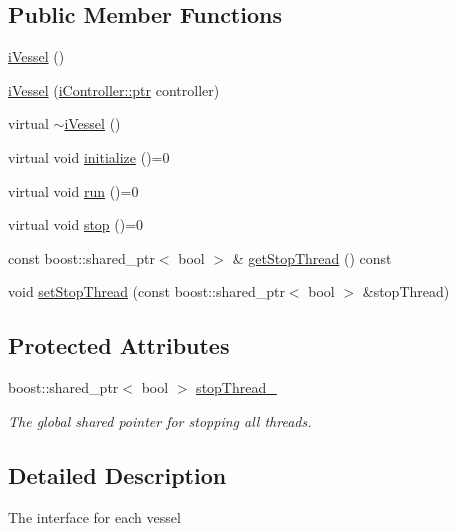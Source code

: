 \subsection*{Public Member Functions}
\begin{DoxyCompactItemize}
\item 
\hyperlink{classo_cpt_1_1i_vessel_a28f9a5ff20f10dc68261b646da3940a5}{i\+Vessel} ()
\item 
\hyperlink{classo_cpt_1_1i_vessel_ac4f486fcfad657f860da2062fef9d7d6}{i\+Vessel} (\hyperlink{classo_cpt_1_1i_controller_a6d89a95cd6ad68bb74adfaca2f36370f}{i\+Controller\+::ptr} controller)
\item 
virtual \hyperlink{classo_cpt_1_1i_vessel_acceefb7d9bffed4f4d8c86fa6808ec23}{$\sim$i\+Vessel} ()
\item 
virtual void \hyperlink{classo_cpt_1_1i_vessel_a866ddfa5330bbb24277de57554a41811}{initialize} ()=0
\item 
virtual void \hyperlink{classo_cpt_1_1i_vessel_a636c138c3d8cb4ddbb2725d36fb12e07}{run} ()=0
\item 
virtual void \hyperlink{classo_cpt_1_1i_vessel_a1cfbb23ae3e73a3587688bf7fbc3f0af}{stop} ()=0
\item 
const boost\+::shared\+\_\+ptr$<$ bool $>$ \& \hyperlink{classo_cpt_1_1i_vessel_a542f07098bb7e1495a4273044ba323ce}{get\+Stop\+Thread} () const 
\item 
void \hyperlink{classo_cpt_1_1i_vessel_aacfbb96114c16a264b133e2d75c5a083}{set\+Stop\+Thread} (const boost\+::shared\+\_\+ptr$<$ bool $>$ \&stop\+Thread)
\end{DoxyCompactItemize}
\subsection*{Protected Attributes}
\begin{DoxyCompactItemize}
\item 
boost\+::shared\+\_\+ptr$<$ bool $>$ \hyperlink{classo_cpt_1_1i_vessel_a9f52bb65db31b6eea42e29a6213dd78a}{stop\+Thread\+\_\+}
\begin{DoxyCompactList}\small\item\em The global shared pointer for stopping all threads. \end{DoxyCompactList}\end{DoxyCompactItemize}


\subsection{Detailed Description}
The interface for each vessel 

